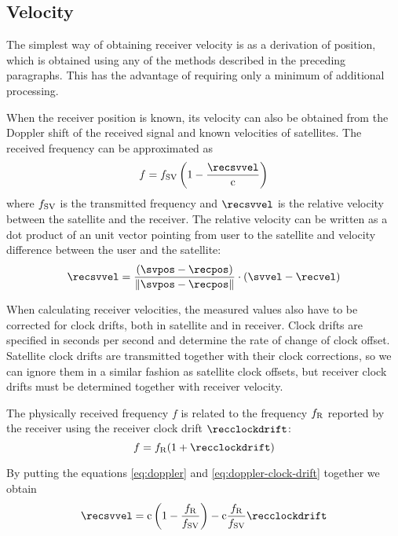 \subsection{Velocity}
The simplest way of obtaining receiver velocity is as a derivation of
position, which is obtained using any of the methods described in the preceding paragraphs.
This has the advantage of requiring only a minimum of additional processing.

When the receiver position is known, its velocity can also be obtained from the Doppler shift of
the received signal and known velocities of satellites.
The received frequency can be approximated as
\begin{equation}
	f = f_\SV \left(1 - \frac{\recsvvel}{\speedoflight}\right)
	\label{eq:doppler}
\end{equation}
where \(f_{\mathrm{SV}}\) is the transmitted frequency and \(\recsvvel\) is the relative velocity
between the satellite and the receiver.
The relative velocity can be written as a dot product of an unit vector pointing
from user to the satellite and velocity difference between the user and the satellite:
\begin{equation}
	\recsvvel = \frac{
		(\svpos - \recpos)
	}{
		\norm{\svpos - \recpos}
	} \cdot (\svvel - \recvel)
	\label{eq:doppler-velocity}
\end{equation}

When calculating receiver velocities, the measured values also have to be corrected for
clock drifts, both in satellite and in receiver.
Clock drifts are specified in seconds per second and determine the rate of change of clock offset.
Satellite clock drifts are transmitted together with their clock corrections, so we can ignore
them in a similar fashion as satellite clock offsets, but receiver clock drifts must be determined
together with receiver velocity.

The physically received frequency \(f\) is related to the frequency \(f_{\mathrm{R}}\) reported by the receiver
using the receiver clock drift \(\recclockdrift\):
\begin{equation}
	f = f_\REC ( 1 + \recclockdrift)
	\label{eq:doppler-clock-drift}
\end{equation}

By putting the equations \eqref{eq:doppler} and \eqref{eq:doppler-clock-drift}
together we obtain
\begin{equation}
	\recsvvel
	=
	\speedoflight \left(1 - \frac{f_\REC}{f_\SV}\right) -
	\speedoflight \frac{f_\REC}{f_\SV} \recclockdrift
\end{equation}

